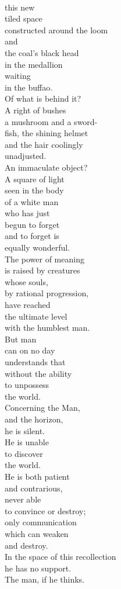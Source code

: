 \documentclass[smalldemyvopaper,11pt,twoside,onecolumn,openright,extrafontsizes]{memoir}
\begin{document}
\\this new
\\tiled space
\\constructed around the loom
\\and
\\the coal's black head
\\in the medallion
\\waiting
\\in the buffao.
\\Of what is behind it?
\\A right of bushes
\\a mushroom and a sword-
\\fish, the shining helmet
\\and the hair coolingly
\\unadjusted.
\\An immaculate object?
\\A square of light
\\seen in the body
\\of a white man
\\who has just
\\begun to forget
\\and to forget is
\\equally wonderful.
\\The power of meaning
\\is raised by creatures
\\whose souls,
\\by rational progression,
\\have reached
\\the ultimate level
\\with the humblest man.
\\But man
\\can on no day
\\understands that
\\without the ability
\\to unpossess
\\the world.
\\Concerning the Man,
\\and the horizon,
\\he is silent.
\\He is unable
\\to discover
\\the world.
\\He is both patient
\\and contrarious,
\\never able
\\to convince or destroy;
\\only communication
\\which can weaken
\\and destroy.
\\In the space of this recollection
\\he has no support.
\\The man, if he thinks.
\end{document}
